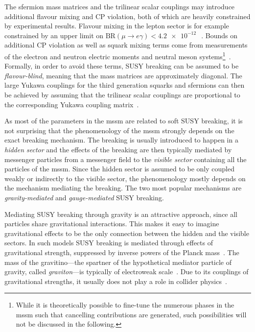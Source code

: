 The sfermion mass matrices and the trilinear scalar couplings may introduce additional flavour mixing and CP violation, both of which are heavily constrained by experimental results. Flavour mixing in the lepton sector is for example constrained by an upper limit on \mbox{$\mathrm{BR}(\mu\rightarrow e\gamma)<\SI{4.2e-12}{}$~\cite{Mori:2016vwi}}. Bounds on additional CP violation as well as squark mixing terms come from measurements of the electron and neutron electric moments and neutral meson systems\footnote{While it is theoretically possible to fine-tune the numerous phases in the \gls{mssm} such that cancelling contributions are generated, such possibilities will not be discussed in the following.}~\cite{dpg2020}. Formally, in order to avoid these terms, SUSY breaking can be assumed to be \textit{flavour-blind}, meaning that the mass matrices are approximately diagonal. The large Yukawa couplings for the third generation squarks and sfermions can then be achieved by assuming that the trilinear scalar couplings are proportional to the corresponding Yukawa coupling matrix~\cite{Martin:1997ns}.

As most of the parameters in the \gls{mssm} are related to soft SUSY breaking, it is not surprising that the phenomenology of the \gls{mssm} strongly depends on the exact breaking mechanism. The breaking is usually introduced to happen in a \textit{hidden sector} and the effects of the breaking are then typically mediated by messenger particles from a messenger field to the \textit{visible sector} containing all the particles of the \gls{mssm}. Since the hidden sector is assumed to be only coupled weakly or indirectly to the visible sector, the phenomenology mostly depends on the mechanism mediating the breaking. The two most popular mechanisms are \textit{gravity-mediated} and \textit{gauge-mediated} SUSY breaking.

Mediating SUSY breaking through gravity is an attractive approach, since all particles share gravitational interactions. This makes it easy to imagine gravitational effects to be the only connection between the hidden and the visible sectors. In such models SUSY breaking is mediated through effects of gravitational strength, suppressed by inverse powers of the Planck mass~\cite{pdg2020}. The mass of the gravitino---the spartner of the hypothetical mediator particle of gravity, called \textit{graviton}---is typically of electroweak scale~\cite{Nilles:1983ge,LAHANAS19871}. Due to its couplings of gravitational strengths, it usually does not play a role in collider physics~\cite{pdg2020}.

